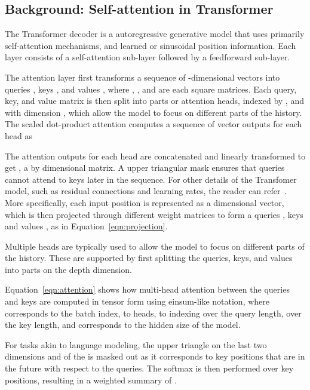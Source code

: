 \documentclass{article} \usepackage{iclr2019_conference,times}
\begin{document}
\subsection{Background: Self-attention in Transformer}

The Transformer decoder is a autoregressive generative model that uses primarily self-attention mechanisms, and learned or sinusoidal position information.  Each layer consists of a self-attention sub-layer followed by a feedforward sub-layer.

\iffalse
The Transformer decoder is an autoregressive generative model, using primarily self-attention mechanisms.  Positional sinusoids are added to the embeddings of the input sequence~\citep{vaswani2017attention}.  Each layer consists of two sub-layers, a self-attention sub-layer and a feedforward sub-layer.


\fi
The attention layer first transforms a sequence of  -dimensional vectors  into queries , keys , and values , where , , and  are each  square matrices. Each  query, key, and value matrix is then split into   parts or attention heads, indexed by , and with dimension , which allow the model to focus on different parts of the history. 
The scaled dot-product attention computes a  sequence of vector outputs for each head as
 
The attention outputs for each head are concatenated and linearly transformed to get , a  by  dimensional matrix. A upper triangular mask ensures that queries cannot attend to keys later in the sequence. For other details of the Transfomer model, such as residual connections and learning rates, the reader can refer~\cite{vaswani2017attention}.
\iffalse
More specifically, each input position  is represented as a  dimensional vector, which is then projected through different weight matrices to form a queries , keys  and values , as in Equation~\ref{eqn:projection}.


Multiple heads are typically used to allow the model to focus on different parts of the history.  These are supported by first splitting the queries, keys, and values into  parts on the depth  dimension. 

Equation~\ref{eqn:attention} shows how multi-head attention between the queries and keys are computed in tensor form using einsum-like notation, where  corresponds to the batch index,  to heads,  to indexing over the query length,  over the key length, and  corresponds to the hidden size of the model.  

For tasks akin to language modeling, the upper triangle on the last two dimensions  and  of the  is masked out as it corresponds to key positions that are in the future with respect to the queries.
The softmax is then performed over key positions, resulting in a weighted summary of .
\end{document}
